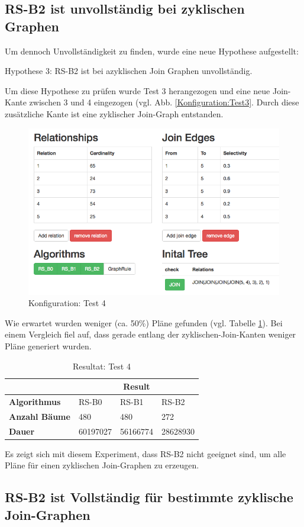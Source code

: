 \subsection{RS-B2 ist unvollständig bei zyklischen Graphen}
Um dennoch Unvollständigkeit zu finden, wurde eine neue Hypothese aufgestellt:

Hypothese 3: RS-B2 ist bei azyklischen Join Graphen unvollständig.

Um diese Hypothese zu prüfen wurde Test 3 herangezogen und eine neue Join-Kante zwischen 3 und 4 eingezogen (vgl. Abb. \ref{Konfiguration:Test3}. Durch diese zusätzliche Kante ist eine zyklischer Join-Graph entstanden. 


\begin{figure}[ht]
  \centering
  \includegraphics[width=\textwidth]{05_ResultsEvaluation/00_media/Test4.png}
  \caption{Konfiguration: Test 4}
  \label{Konfiguration:Test4}
\end{figure}

Wie erwartet wurden weniger (ca. 50\%) Pläne gefunden (vgl. Tabelle \ref{Result:Test4}). Bei einem Vergleich fiel auf, dass gerade entlang der zyklischen-Join-Kanten weniger Pläne generiert wurden.


\begin{table}[h]
\centering
\begin{tabular}{|l|l|l|l|}
\hline
                         & \multicolumn{3}{c|}{{\bf Result}} \\ \hline
{\bf Algorithmus}        & RS-B0     & RS-B1     & RS-B2     \\ \hline
{\bf Anzahl Bäume}       & 480       & 480       & 272       \\ \hline
{\bf Dauer}              & 60197027  & 56166774  & 28628930  \\ \hline
\end{tabular}

\caption{Resultat: Test 4}
\label{Result:Test4}
\end{table}

Es zeigt sich mit diesem Experiment, dass RS-B2 nicht geeignet sind, um alle Pläne für einen zyklischen Join-Graphen zu erzeugen.

\subsection{RS-B2 ist Vollständig für bestimmte zyklische Join-Graphen}







